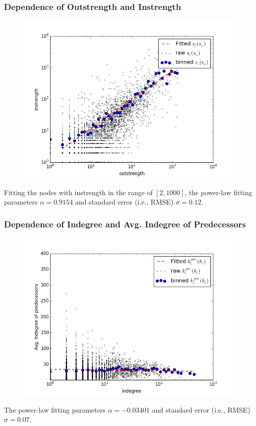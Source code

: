 \documentclass{beamer}
\begin{document}
\begin{frame}
\frametitle{Dependence of Outstrength and Instrength}
\begin{figure}
\includegraphics[width=0.8\linewidth]{figs/in_out_strength.png}
\end{figure}
\small{Fitting the nodes with instrength in the range of $[2, 1000]$, the power-law fitting parameters $\alpha=0.9154$ and standard error (i.e., RMSE) $\sigma= 0.12$.}
\end{frame}


\begin{frame}
\frametitle{Dependence of Indegree and Avg. Indegree of Predecessors}
\begin{figure}
\includegraphics[width=0.8\linewidth]{figs/pre_in_in_d.png}
\end{figure}
\small{The power-law fitting parameters $\alpha=-0.03401$ and standard error (i.e., RMSE) $\sigma= 0.07$.}
\end{frame}
\end{document}

